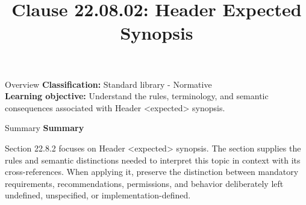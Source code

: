\documentclass[10pt,letterpaper]{article}
\title{Clause 22.08.02: Header Expected Synopsis}
\author{}
\date{}
\begin{document}
\maketitle
\begin{CornellOverviewBox}{Overview}
\textbf{Classification:} Standard library - Normative\\[2pt]
\textbf{Learning objective:} Understand the rules, terminology, and semantic consequences associated with Header <expected> synopsis.
\end{CornellOverviewBox}\begin{CornellSummaryBox}{Summary}
{\sffamily\bfseries\color{Accent} Summary}\par\vspace{3pt}Section 22.8.2 focuses on Header <expected> synopsis. The section supplies the rules and semantic distinctions needed to interpret this topic in context with its cross-references. When applying it, preserve the distinction between mandatory requirements, recommendations, permissions, and behavior deliberately left undefined, unspecified, or implementation-defined.
\end{CornellSummaryBox}
\end{document}
